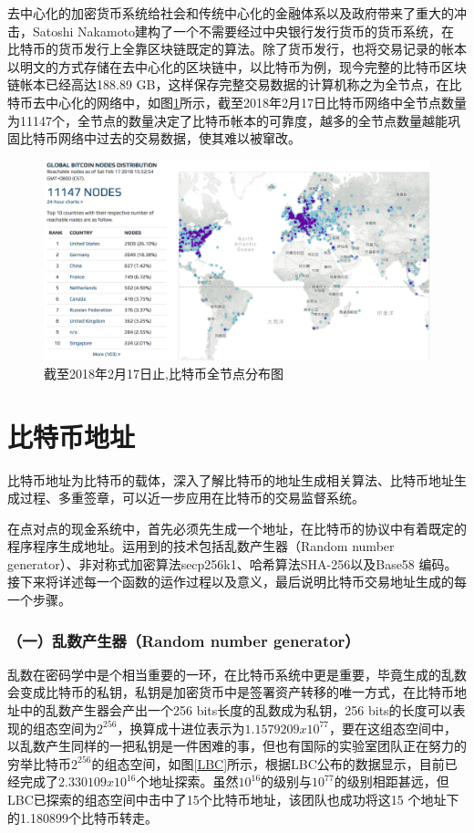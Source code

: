 		去中⼼化的加密货币系统给社会和传统中⼼化的⾦融体系以及政府带来了重⼤的冲击，Satoshi Nakamoto建构了一个不需要经过中央银行发行货币的货币系统，在比特币的货币发行上全靠区块链既定的算法。除了货币发行，也将交易记录的帐本以明文的方式存储在去中心化的区块链中，以比特币为例，现今完整的比特币区块链帐本已经高达188.89 GB，这样保存完整交易数据的计算机称之为全节点，在比特币去中心化的网络中，如图\ref{bitcoinfullnode}所示，截至2018年2月17日比特币网络中全节点数量为11147个\supercite{bitcoinfullnode}，全节点的数量决定了比特币帐本的可靠度，越多的全节点数量越能巩固⽐特币网络中过去的交易数据，使其难以被窜改。

		\begin{figure}
			\centering
			\includegraphics[width = .9\textwidth]{bitcoinfullnode.png}
			\caption{截至2018年2月17日止,⽐特币全节点分布图\supercite{bitcoinfullnode}}\label{bitcoinfullnode}
		\end{figure}


		\section{比特币地址}
		⽐特币地址为⽐特币的载体，深⼊了解⽐特币的地址⽣成相关算法、⽐特币地址⽣成过程、多重签章，可以近⼀步应⽤在比特币的交易监督系统。
		
		在点对点的现金系统中，首先必须先生成一个地址，在比特币的协议中有着既定的程序程序生成地址。运用到的技术包括乱数产生器（Random number generator）、非对称式加密算法secp256k1\supercite{johnson2001elliptic}、哈希算法SHA-256\supercite{DBLP:conf/fse/KhovratovichRS12}以及Base58 编码\supercite{Base58}。接下来将详述每一个函数的运作过程以及意义，最后说明比特币交易地址生成的每一个步骤。
			
				\subsubsection{（一）乱数产生器（Random number generator）}
				乱数在密码学中是个相当重要的一环，在比特币系统中更是重要，毕竟生成的乱数会变成比特币的私钥，私钥是加密货币中是签署资产转移的唯一方式，在比特币地址中的乱数产生器会产出一个256 bits长度的乱数成为私钥，256 bits的长度可以表现的组态空间为$2^{256}$，换算成十进位表示为$1.1579209x10^{77}$，要在这组态空间中，以乱数产生同样的一把私钥是一件困难的事，但也有国际的实验室\supercite{TheLargeBitcoinCollider}团队正在努力的穷举比特币$2^{256}$的组态空间，如图\ref{LBC}所示，根据LBC公布的数据显示，目前已经完成了$2.330109x10^{16}$个地址探索。虽然$10^{16}$的级别与$10^{77}$的级别相距甚远，但LBC已探索的组态空间中击中了15个比特币地址，该团队也成功将这15 个地址下的1.180899个比特币转走。

